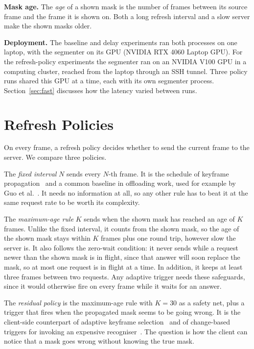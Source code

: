 \documentclass[conference]{IEEEtran}
\begin{document}
\textbf{Mask age.} The \emph{age} of a shown mask is the number of frames between its source frame and the frame it is shown on. Both a long refresh interval and a slow server make the shown masks older.

\textbf{Deployment.} The baseline and delay experiments ran both processes on one laptop, with the segmenter on its GPU (NVIDIA RTX 4060 Laptop GPU). For the refresh-policy experiments the segmenter ran on an NVIDIA V100 GPU in a computing cluster, reached from the laptop through an SSH tunnel. Three policy runs shared this GPU at a time, each with its own segmenter process. Section~\ref{sec:fast} discusses how the latency varied between runs.

\section{Refresh Policies}
\label{sec:policies}

On every frame, a refresh policy decides whether to send the current frame to the server. We compare three policies.

The \emph{fixed interval} $N$ sends every $N$-th frame. It is the schedule of keyframe propagation~\cite{zhu2017dff} and a common baseline in offloading work, used for example by Guo et al.~\cite{guo2025ltedada}. It needs no information at all, so any other rule has to beat it at the same request rate to be worth its complexity.

The \emph{maximum-age rule} $K$ sends when the shown mask has reached an age of $K$ frames. Unlike the fixed interval, it counts from the shown mask, so the age of the shown mask stays within $K$ frames plus one round trip, however slow the server is. It also follows the zero-wait condition: it never sends while a request newer than the shown mask is in flight, since that answer will soon replace the mask, so at most one request is in flight at a time. In addition, it keeps at least three frames between two requests. Any adaptive trigger needs these safeguards, since it would otherwise fire on every frame while it waits for an answer.

The \emph{residual policy} is the maximum-age rule with $K=30$ as a safety net, plus a trigger that fires when the propagated mask seems to be going wrong. It is the client-side counterpart of adaptive keyframe selection~\cite{li2018lowlatency, xu2018dvsnet} and of change-based triggers for invoking an expensive recogniser~\cite{chen2015glimpse, apicharttrisorn2019marlin, xiao2022stac}. The question is how the client can notice that a mask goes wrong without knowing the true mask.
\end{document}
